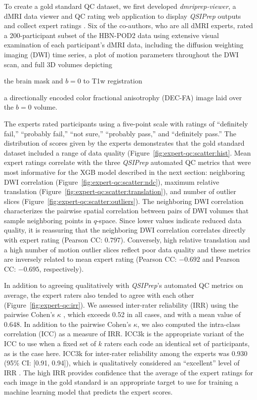 \documentclass[9pt,lineno]{elife}
\begin{document}
To create a gold standard QC dataset, we first developed \emph{dmriprep-viewer},
a dMRI data viewer and QC rating web application to display \emph{QSIPrep}
outputs and collect expert ratings \citep{richie-halford2021-viewer}. Six of the
co-authors, who are all dMRI experts, rated a 200-participant subset of the
HBN-POD2 data using extensive visual examination of each participant's dMRI data,
including the diffusion weighting imaging (DWI) time series, a plot of
motion parameters throughout the DWI scan, and full 3D volumes depicting
\begin{enumerate*}[%
    label=(\roman*),%
    before={{ }},%
    itemjoin={{, }},%
    itemjoin*={{ and }}]
    \item the brain mask and $b=0$ to T1w registration
    \item a directionally encoded color fractional anisotrophy (DEC-FA) image laid over the $b=0$ volume.
\end{enumerate*}
The experts rated participants using a five-point scale with ratings of ``definitely
fail,'' ``probably fail,'' ``not sure,'' ``probably pass,'' and ``definitely
pass.'' The distribution of scores given by the experts demonstrates that the
gold standard dataset included a range of data quality (Figure~\ref{fig:expert-qc:scatter:hist}. Mean expert ratings
correlate with the three \emph{QSIPrep} automated QC metrics that were most informative for the XGB model described in the next section:
neighboring DWI correlation \citep{yeh2019-kb} (Figure~\ref{fig:expert-qc:scatter:ndc}), maximum relative
translation (Figure~\ref{fig:expert-qc:scatter:translation}), and number of outlier slices (Figure~\ref{fig:expert-qc:scatter:outliers}). The neighboring DWI correlation characterizes
the pairwise spatial correlation between pairs of DWI volumes that sample
neighboring points in $q$-space. Since lower values indicate reduced data
quality, it is reassuring that the neighboring DWI correlation correlates directly with expert rating
(Pearson CC: $0.797$). Conversely, high relative translation and a high number of
motion outlier slices reflect poor data quality and these metrics are inversely
related to mean expert rating (Pearson CC: $-0.692$ and Pearson CC: $-0.695$,
respectively).

In addition to agreeing qualitatively with \emph{QSIPrep}'s automated QC metrics
on average, the expert raters also tended to agree with each other (Figure~\ref{fig:expert-qc:irr}). We assessed
inter-rater reliability (IRR) using the pairwise Cohen's $\kappa$
\citep{di-eugenio2004-bb}, which exceeds 0.52 in all cases, and with a mean value of
0.648. In addition to the pairwise Cohen's $\kappa$, we also computed the
intra-class correlation (ICC) \citep{hallgren2012-ze} as a measure of IRR. ICC3k
is the appropriate variant of the ICC to use when a fixed set of $k$ raters each
code an identical set of participants, as is the case here. ICC3k for inter-rater
reliability among the experts was 0.930 (95\% CI: [0.91, 0.94]), which is
qualitatively considered an ``excellent'' level of IRR \citep{Cicchetti1994-fz}.
The high IRR provides confidence that the average of the expert ratings for each
image in the gold standard is an appropriate target to use for training a
machine learning model that predicts the expert scores.
\end{document}
